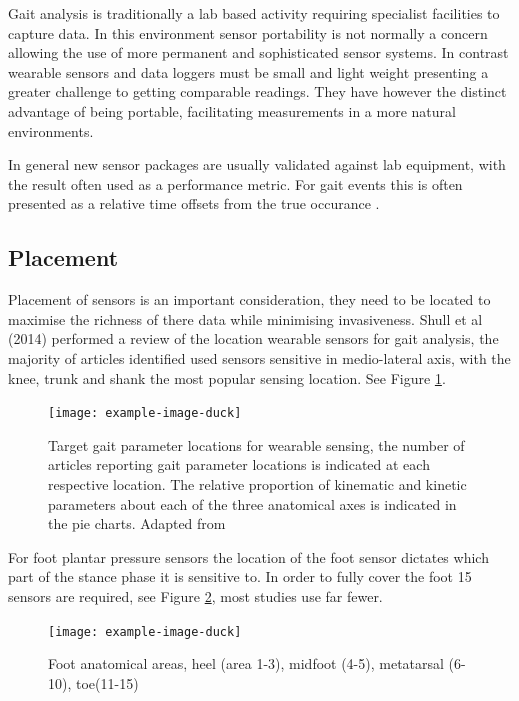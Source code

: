 Gait analysis is traditionally a lab based activity requiring specialist facilities to capture data\cite{LeMoyne2017}. In this environment sensor portability is not normally a concern allowing the use of more permanent and sophisticated sensor systems. In contrast wearable sensors and data loggers must be small and light weight presenting a greater challenge to getting comparable readings. They have however the distinct advantage of being portable, facilitating measurements in a more natural environments\cite{Shull2014}.

In general new sensor packages are usually validated against lab equipment, with the result often used as a performance metric. For gait events this is often presented as a relative time offsets from the true occurance \cite{Greene2012, Lin2014, Doheny2010, Bejarano2015, Patterson2012}.

\subsection{Placement}
Placement of sensors is an important consideration, they need to be located to maximise the richness of there data while minimising invasiveness\cite{Tucker2015}. Shull et al (2014) performed a review of the location wearable sensors for gait analysis, the majority of articles identified used sensors sensitive in medio-lateral axis, with the knee, trunk and shank the most popular sensing location. See Figure \ref{fig:ch3_shull_wearable_sensor_position}.

\begin{figure}[hbt]
    \centering
    \texttt{[image: example-image-duck]}
    \caption{Target gait parameter locations for wearable sensing, the number of articles reporting gait parameter locations is indicated at each respective location. The relative proportion of kinematic and kinetic parameters about each of the three anatomical axes is indicated in the pie charts. Adapted from \cite{Shull2014}}
    \label{fig:ch3_shull_wearable_sensor_position}
\end{figure}

For foot plantar pressure sensors the location of the foot sensor dictates which part of the stance phase it is sensitive to. In order to fully cover the foot 15 sensors are required\cite{AbdulRazak2012}, see Figure \ref{fig:lit-rev_foot_anatomical_area}, most studies use far fewer.

\begin{figure}[hbt]
    \centering
    \texttt{[image: example-image-duck]}
    \caption{Foot anatomical areas, heel (area 1-3), midfoot (4-5), metatarsal (6-10), toe(11-15)\cite{AbdulRazak2012}}
    \label{fig:lit-rev_foot_anatomical_area}
\end{figure}

